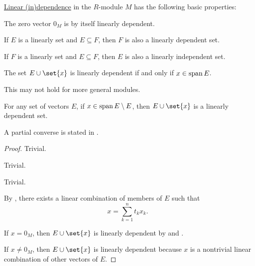 \begin{proposition}\label{thm:def:linear_dependence}
  \hyperref[def:linear_dependence]{Linear (in)dependence} in the \( R \)-module \( M \) has the following basic properties:
  \begin{thmenum}
     The zero vector \( 0_M \) is by itself linearly dependent.

     If \( E \) is a linearly  set and \( E \subseteq F \), then \( F \) is also a linearly dependent set.

     If \( F \) is a linearly  set and \( E \subseteq F \), then \( E \) is also a linearly independent set.

     The set \( E \cup \set{ x } \) is linearly dependent if and only if \( x \in \operatorname{span} E \).

    This may not hold for more general modules.

     For any set of vectors \( E \), if \( x \in \operatorname{span} E \setminus E \), then \( E \cup \set{ x } \) is a linearly dependent set.

    A partial converse is stated in .
  \end{thmenum}
\end{proposition}
\begin{proof}
   Trivial.

   Trivial.

   Trivial.

   By , there exists a linear combination of members of \( E \) such that
  \begin{equation*}
    x = \sum_{k=1}^n t_k x_k.
  \end{equation*}

  If \( x = 0_M \), then \( E \cup \set{ x } \) is linearly dependent by  and .

  If \( x \neq 0_M \), then \( E \cup \set{ x } \) is linearly dependent because \( x \) is a nontrivial linear combination of other vectors of \( E \).
\end{proof}

